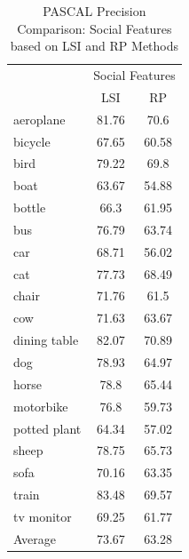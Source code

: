 \begin{table}[!ht]
\caption{ PASCAL Precision Comparison: Social Features based on LSI and RP Methods} %
\centering
\begin{tabular}{|p{1.7cm}|c|c|}
 \hline
{\multirow{2}{*}{Labels}} & \multicolumn{2}{|c|}{Social Features} \\
\cline{2-3}
 & LSI & RP \\  [1ex] \hline
aeroplane & 81.76 & 70.6 \\  [1ex] \hline
bicycle & 67.65 & 60.58 \\  [1ex] \hline
bird & 79.22 & 69.8 \\  [1ex] \hline
boat & 63.67 & 54.88 \\  [1ex] \hline
bottle & 66.3 & 61.95 \\  [1ex] \hline
bus & 76.79 & 63.74 \\  [1ex] \hline
car & 68.71 & 56.02 \\  [1ex] \hline
cat & 77.73 & 68.49 \\  [1ex] \hline
chair & 71.76 & 61.5 \\  [1ex] \hline
cow & 71.63 & 63.67 \\  [1ex] \hline
dining table & 82.07 & 70.89 \\  [1ex] \hline
dog & 78.93 & 64.97 \\  [1ex] \hline
horse & 78.8 & 65.44 \\  [1ex] \hline
motorbike & 76.8 & 59.73 \\  [1ex] \hline
potted plant & 64.34 & 57.02 \\  [1ex] \hline
sheep & 78.75 & 65.73 \\  [1ex] \hline
sofa & 70.16 & 63.35 \\  [1ex] \hline
train & 83.48 & 69.57 \\  [1ex] \hline
tv monitor & 69.25 & 61.77 \\  [1ex] \hline
Average & 73.67 & 63.28 \\  [1ex] \hline
\end{tabular}
 \label{PASCAL PrecisionSocialFeatures} %
\end{table}

